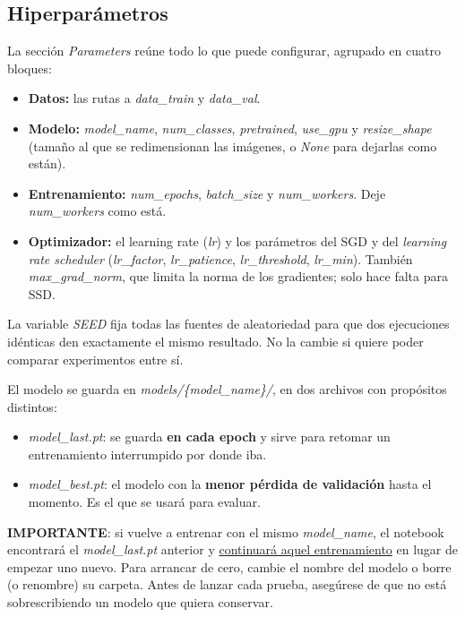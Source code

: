 \documentclass[12pt,a4paper]{article}
\begin{document}
\subsection{Hiperparámetros}
\label{sec:semana2-params}

La sección \textit{Parameters} reúne todo lo que puede configurar, agrupado en cuatro bloques:

\begin{itemize}
    \item \textbf{Datos:} las rutas a \textit{data\_train} y \textit{data\_val}.
    \item \textbf{Modelo:} \textit{model\_name}, \textit{num\_classes}, \textit{pretrained}, \textit{use\_gpu} y \textit{resize\_shape} (tamaño al que se redimensionan las imágenes, o \textit{None} para dejarlas como están).
    \item \textbf{Entrenamiento:} \textit{num\_epochs}, \textit{batch\_size} y \textit{num\_workers}. Deje \textit{num\_workers} como está.
    \item \textbf{Optimizador:} el learning rate (\textit{lr}) y los parámetros del SGD y del \textit{learning rate scheduler} (\textit{lr\_factor}, \textit{lr\_patience}, \textit{lr\_threshold}, \textit{lr\_min}). También \textit{max\_grad\_norm}, que limita la norma de los gradientes; solo hace falta para SSD.
\end{itemize}

La variable \textit{SEED} fija todas las fuentes de aleatoriedad para que dos ejecuciones idénticas den exactamente el mismo resultado. No la cambie si quiere poder comparar experimentos entre sí.

El modelo se guarda en \textit{models/\{model\_name\}/}, en dos archivos con propósitos distintos:

\begin{itemize}
    \item \textit{model\_last.pt}: se guarda \textbf{en cada epoch} y sirve para retomar un entrenamiento interrumpido por donde iba.
    \item \textit{model\_best.pt}: el modelo con la \textbf{menor pérdida de validación} hasta el momento. Es el que se usará para evaluar.
\end{itemize}

\begin{framed}
    \textbf{IMPORTANTE}: si vuelve a entrenar con el mismo \textit{model\_name}, el notebook encontrará el \textit{model\_last.pt} anterior y \underline{continuará aquel entrenamiento} en lugar de empezar uno nuevo. Para arrancar de cero, cambie el nombre del modelo o borre (o renombre) su carpeta. Antes de lanzar cada prueba, asegúrese de que no está sobrescribiendo un modelo que quiera conservar.
\end{framed}
\end{document}
